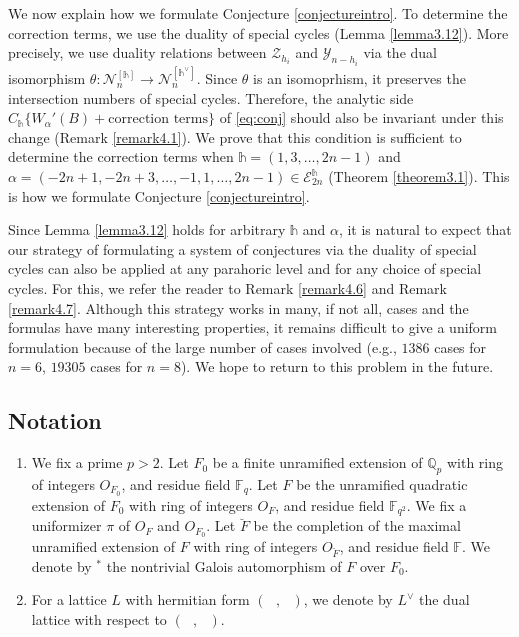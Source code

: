 \documentclass[11pt,oneside]{amsart}
\theoremstyle{plain}
\theoremstyle{definition}
\theoremstyle{remark}
\newcommand{\tx}[1]{\text{#1}}
\newcommand{\BF}{{\mathbb F}}
\newcommand{\BQ}{{\mathbb Q}}
\newcommand{\CE}{{\mathcal E}}
\newcommand{\CN}{{\mathcal N}}
\newcommand{\CY}{{\mathcal Y}}
\newcommand{\CZ}{{\mathcal Z}}
\numberwithin{equation}{section}
\begin{document}
	 We now explain how we formulate Conjecture \ref{conjectureintro}. To determine the correction terms, we use the duality of special cycles (Lemma \ref{lemma3.12}). More precisely, we use duality relations between $\CZ_{h_i}$ and $\CY_{n-h_i}$ via the dual isomorphism $\theta:\CN_n^{[\mathds{h}]} \rightarrow \CN_n^{[\mathds{h}^{\vee}]}$. Since $\theta$ is an isomoprhism, it preserves the intersection numbers of special cycles. Therefore, the analytic side $C_{\mathds{h}}\lbrace W_{\alpha}'(B)+\tx{correction terms}\rbrace$ of \eqref{eq:conj} should also be invariant under this change (Remark \ref{remark4.1}). We prove that this condition is sufficient to determine the correction terms when $\mathds{h}=(1,3,\dots,2n-1)$ and $\alpha=(-2n+1,-2n+3,\dots,-1,1,\dots,2n-1) \in \CE_{2n}^{\mathds{h}}$ (Theorem \ref{theorem3.1}). This is how we formulate Conjecture \ref{conjectureintro}.
	 
	 Since Lemma \ref{lemma3.12} holds for arbitrary $\mathds{h}$ and $\alpha$, it is natural to expect that our strategy of formulating a system of conjectures via the duality of special cycles can also be applied at any parahoric level and for any choice of special cycles. For this, we refer the reader to Remark \ref{remark4.6} and Remark \ref{remark4.7}. Although this strategy works in many, if not all, cases and the formulas have many interesting properties, it remains difficult to give a uniform formulation because of the large number of cases involved (e.g., $1386$ cases for $n=6$, $19305$ cases for $n=8$). We hope to return to this problem in the future.
	 
	
	 
	 
	 
	 
	 
	
	\subsection*{Notation}
	\begin{enumerate}
		\item We fix a prime $p>2$. Let $F_0$ be a finite unramified extension of $\BQ_p$ with ring of integers $O_{F_0}$, and residue field $\BF_q$. Let $F$ be the unramified quadratic extension of $F_0$ with ring of integers $O_F$, and residue field $\BF_{q^2}$. We fix a uniformizer $\pi$ of $O_F$ and $O_{F_0}$. Let $\breve F$ be the completion of the maximal unramified extension of $F$ with ring of integers $O_{\breve{F}}$, and residue field $\BF$. We denote by $^*$ the nontrivial Galois automorphism of $F$ over $F_0$.
		\item For a lattice $L$ with hermitian form $(\text{ },\text{ })$, we denote by $L^{\vee}$ the dual lattice with respect to $(\text{ },\text{ })$.
	\end{enumerate}
	
\end{document}
